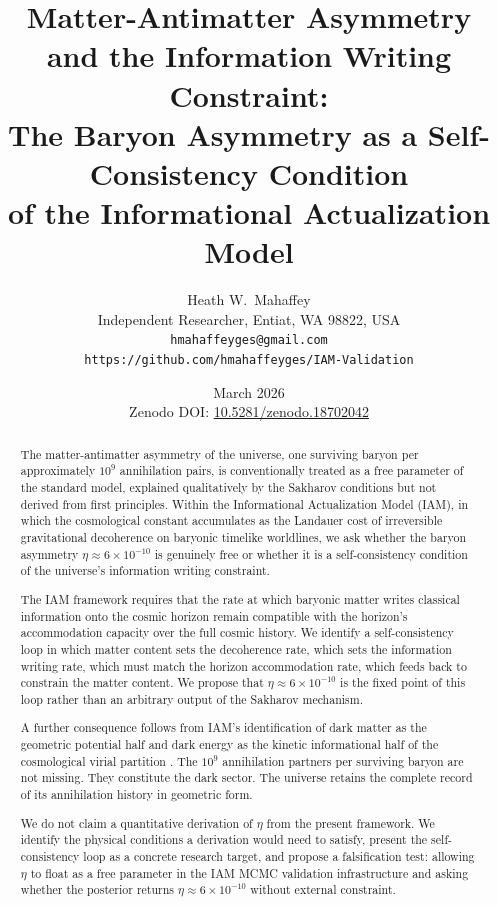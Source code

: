 \documentclass[12pt,a4paper]{article}
\title{\textbf{Matter-Antimatter Asymmetry and the Information Writing Constraint:}\\
\large The Baryon Asymmetry as a Self-Consistency Condition\\
of the Informational Actualization Model}
\author{Heath W.\ Mahaffey\\
\small Independent Researcher, Entiat, WA 98822, USA\\
\small \texttt{hmahaffeyges@gmail.com}\\
\small \texttt{https://github.com/hmahaffeyges/IAM-Validation}}
\date{March 2026\\
\small Zenodo DOI:
\href{https://doi.org/10.5281/zenodo.18702042}{10.5281/zenodo.18702042}}
\begin{document}
\maketitle

\begin{abstract}
The matter-antimatter asymmetry of the universe, one surviving baryon
per approximately $10^9$ annihilation pairs, is conventionally treated
as a free parameter of the standard model, explained qualitatively by
the Sakharov conditions but not derived from first principles. Within
the Informational Actualization Model (IAM), in which the cosmological
constant accumulates as the Landauer cost of irreversible gravitational
decoherence on baryonic timelike worldlines, we ask whether the baryon
asymmetry $\eta \approx 6 \times 10^{-10}$ is genuinely free or whether
it is a self-consistency condition of the universe's information writing
constraint.

The IAM framework requires that the rate at which baryonic matter writes
classical information onto the cosmic horizon remain compatible with the
horizon's accommodation capacity over the full cosmic history. We
identify a self-consistency loop in which matter content sets the
decoherence rate, which sets the information writing rate, which must
match the horizon accommodation rate, which feeds back to constrain the
matter content. We propose that $\eta \approx 6 \times 10^{-10}$ is the
fixed point of this loop rather than an arbitrary output of the Sakharov
mechanism.

A further consequence follows from IAM's identification of dark matter
as the geometric potential half and dark energy as the kinetic
informational half of the cosmological virial partition
\citep{mahaffey2026_virial_dm}. The $10^9$ annihilation partners per
surviving baryon are not missing. They constitute the dark sector. The
universe retains the complete record of its annihilation history in
geometric form.

We do not claim a quantitative derivation of $\eta$ from the present
framework. We identify the physical conditions a derivation would need
to satisfy, present the self-consistency loop as a concrete research
target, and propose a falsification test: allowing $\eta$ to float as a
free parameter in the IAM MCMC validation infrastructure and asking
whether the posterior returns $\eta \approx 6 \times 10^{-10}$ without
external constraint.
\end{abstract}
\end{document}
